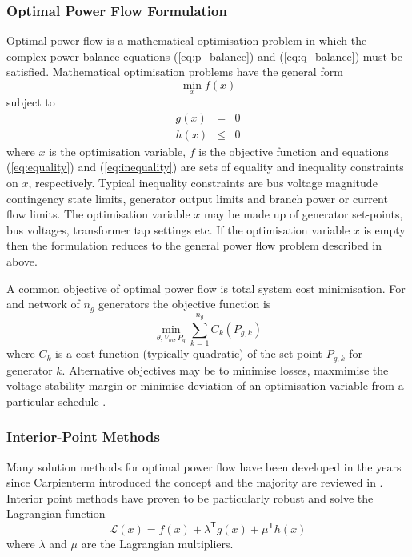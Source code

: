 \subsubsection{Optimal Power Flow Formulation}
Optimal power flow is a mathematical optimisation problem in which the complex
power balance equations (\ref{eq:p_balance}) and (\ref{eq:q_balance}) must be
satisfied.  Mathematical optimisation problems have the general form
\begin{equation}
\min_x f(x)
\end{equation}
subject to
\begin{eqnarray}
\label{eq:equality}
g(x)& =& 0\\
\label{eq:inequality}
h(x)& \leq& 0
\end{eqnarray}
where $x$ is the optimisation variable, $f$ is the objective function and
equations (\ref{eq:equality}) and (\ref{eq:inequality}) are sets of equality
and inequality constraints on $x$, respectively.  Typical inequality
constraints are bus voltage magnitude contingency state limits, generator
output limits and branch power or current flow limits.  The optimisation
variable $x$ may be made up of generator set-points, bus voltages, transformer
tap settings etc.  If the optimisation variable $x$ is empty then the
formulation reduces to the general power flow problem described in above.

A common objective of optimal power flow is total system cost minimisation.
For and network of $n_g$ generators the objective function is
\begin{equation}
\min_{\theta, V_m, P_g} \sum_{k=1}^{n_g} C_k(P_{g,k})
\end{equation}
where $C_k$ is a cost function (typically quadratic) of the set-point $P_{g,k}$
for generator $k$.  Alternative objectives may be to minimise losses, maxmimise
the voltage stability margin or minimise deviation of an optimisation variable
from a particular schedule \cite[\S18]{kallrath:2009}.

\subsubsection{Interior-Point Methods}
Many solution methods for optimal power flow have been developed in the
years since Carpienterm introduced the concept and the majority are reviewed
in \cite{momoh:part1,momoh:part2}.  Interior point methods have proven to be
particularly robust and solve the Lagrangian function
\begin{equation}
\mathcal{L}(x) = f(x) + \lambda^\mathsf{T}g(x) + \mu^\mathsf{T}h(x)
\end{equation}
where $\lambda$ and $\mu$ are the Lagrangian multipliers.


